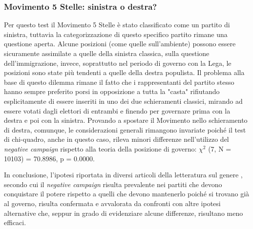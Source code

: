 \subsubsection{Movimento 5 Stelle: sinistra o destra?}
Per questo test il Movimento 5 Stelle è stato classificato come un partito di sinistra, tuttavia la categorizzazione di questo specifico partito rimane una questione aperta. Alcune posizioni (come quelle sull'ambiente) possono essere sicuramente assimilate a quelle della sinistra classica, sulla questione dell'immigrazione, invece, soprattutto nel periodo di governo con la Lega, le posizioni sono state più tendenti a quelle della destra populista. Il problema alla base di questo dilemma rimane il fatto che i rappresentanti del partito stesso hanno sempre preferito porsi in opposizione a tutta la "casta" rifiutando esplicitamente di essere inseriti in uno dei due schieramenti classici, mirando ad  essere votati dagli elettori di entrambi e finendo per governare prima con la destra e poi con la sinistra. Provando a spostare il Movimento nello schieramento di destra, comunque, le considerazioni generali rimangono invariate poiché il test di chi-quadro, anche in questo caso, rileva minori differenze nell'utilizzo del \textit{negative campaign} rispetto alla teoria della posizione di governo: $\chi^{2}$ (7, N = 10103) = 70.8986, p = 0.0000.

In conclusione, l'ipotesi riportata in diversi articoli della letteratura sul genere \citep{hansen2008} \citep{druckman2010} \citep{walter2014} \citep{curini2010}, secondo cui il \textit{negative campaign} risulta prevalente nei partiti che devono conquistare il potere rispetto a quelli che devono mantenerlo poiché si trovano già al governo, risulta confermata e avvalorata da confronti con altre ipotesi alternative che, seppur in grado di evidenziare alcune differenze, risultano meno efficaci.


